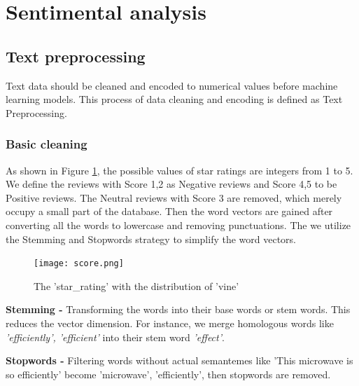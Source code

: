\documentclass[12pt]{article}%
\renewcommand{\thefootnote}{\Roman{footnote}}
\begin{document}
\section{Sentimental analysis}


\subsection{Text preprocessing}
Text data should be cleaned and encoded to numerical values before machine learning models. This process of data cleaning and encoding is defined as Text Preprocessing.

\subsubsection{Basic cleaning}
	
	As shown in Figure \ref{score}, the possible values of star ratings are integers from 1 to 5. We define the reviews with Score 1,2 as Negative reviews and Score 4,5 to be Positive reviews. The Neutral reviews with Score 3 are removed, which merely occupy a small part of the database. Then the word vectors\cite{BOW} are gained after converting all the words to lowercase and removing punctuations. The we utilize the Stemming and Stopwords strategy to simplify the word vectors.
	
	\begin{figure}[H]
		\centering
		\texttt{[image: score.png]}%
		\caption{The 'star\_rating' with the distribution of 'vine'	}\label{score}%
	\end{figure}

	\renewcommand{\thefootnote}{\arabic{footnote}}

	\textbf{Stemming -} Transforming the words into their base words or stem words. This reduces the vector dimension. For instance, we merge homologous words like \textit{'efficiently', 'efficient'}  into their stem word \textit{'effect'}.
	
	\textbf{Stopwords -} Filtering words without actual semantemes like 'This microwave is so efficiently' become 'microwave', 'efficiently', then stopwords are removed.
\end{document}
